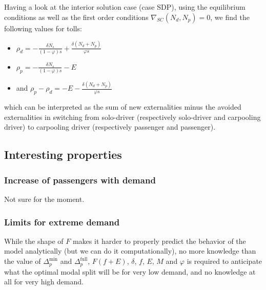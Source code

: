 \documentclass[english, a4paper]{article}
\theoremstyle{plain}
\theoremstyle{definition}
\theoremstyle{remark}
\begin{document}
Having a look at the interior solution case (case SDP), using the equilibrium conditions as well as the first order conditions $\nabla_{SC} (N_d, N_p) = 0$, we find the following values for tolls:

\begin{itemize}
    \item $\rho_d = -\frac{\delta N_s}{(1 - \varphi ) s} + \frac{\delta (N_d + N_p)}{\varphi s}$
    \item $\rho_p = -\frac{\delta N_s}{(1 - \varphi )s} - E$
    \item and $\rho_p - \rho_d = -E - \frac{\delta (N_d + N_p)}{\varphi s}$
\end{itemize}
which can be interpreted as the sum of new externalities minus the avoided externalities in switching from solo-driver (respectively solo-driver and carpooling driver) to carpooling driver (respectively passenger and passenger).

\subsection{Interesting properties}




\subsubsection{Increase of passengers with demand}

Not sure for the moment.

\subsubsection{Limits for extreme demand}

While the shape of $F$ makes it harder to properly predict the behavior of the model analytically (but we can do it computationally), no more knowledge than the value of $\Delta_p^{\text{min}}$ and $\Delta_p^{\text{full}}$, $F(f + E)$,  $\delta$, $f$, $E$, $M$ and $\varphi$ is required to anticipate what the optimal modal split will be for very low demand, and no knowledge at all for very high demand.
\end{document}
